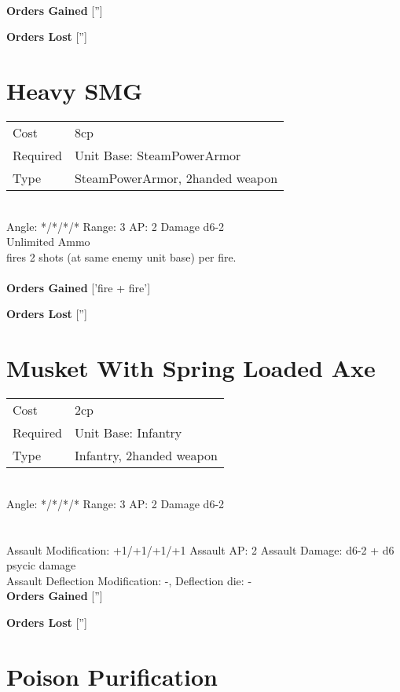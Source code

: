 \ \\

{\bf Orders Gained}
['']

{\bf Orders Lost}
['']
\section{ Heavy SMG }

\begin{tabular}{ll}
    Cost & 8cp \\
    Required & Unit Base: SteamPowerArmor\\
    Type & SteamPowerArmor, 2handed weapon\\
\end{tabular}
\ \\
\indent Angle: */*/*/* Range: 3  AP: 2 Damage d6-2 \\
Unlimited Ammo \\ fires 2 shots (at same enemy unit base) per fire. \\ 
\ \\

{\bf Orders Gained}
['fire + fire']

{\bf Orders Lost}
['']
\section{ Musket With Spring Loaded Axe }

\begin{tabular}{ll}
    Cost & 2cp \\
    Required & Unit Base: Infantry\\
    Type & Infantry, 2handed weapon\\
\end{tabular}
\ \\
\indent Angle: */*/*/* Range: 3  AP: 2 Damage d6-2 \\
 \\
\ \\
Assault Modification: +1/+1/+1/+1 Assault AP: 2 Assault Damage: d6-2 + d6 psycic damage\\
Assault Deflection Modification: -, Deflection die: - \\


{\bf Orders Gained}
['']

{\bf Orders Lost}
['']


\section{ Poison Purification }

